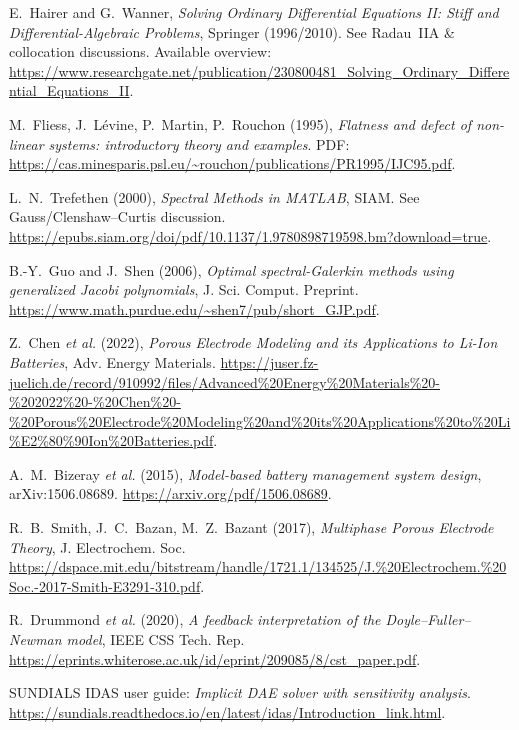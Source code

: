 \documentclass[11pt]{article}
\begin{document}
\begin{thebibliography}{99}\setlength{\itemsep}{0.25em}
E.~Hairer and G.~Wanner, \emph{Solving Ordinary Differential Equations II: Stiff and Differential-Algebraic Problems}, Springer (1996/2010). See Radau~IIA \& collocation discussions. Available overview: \url{https://www.researchgate.net/publication/230800481_Solving_Ordinary_Differential_Equations_II}.

M.~Fliess, J.~L\'evine, P.~Martin, P.~Rouchon (1995), \emph{Flatness and defect of non-linear systems: introductory theory and examples}. PDF: \url{https://cas.minesparis.psl.eu/~rouchon/publications/PR1995/IJC95.pdf}.

L.~N.~Trefethen (2000), \emph{Spectral Methods in MATLAB}, SIAM. See Gauss/Clenshaw--Curtis discussion. \url{https://epubs.siam.org/doi/pdf/10.1137/1.9780898719598.bm?download=true}.

B.-Y.~Guo and J.~Shen (2006), \emph{Optimal spectral-Galerkin methods using generalized Jacobi polynomials}, J. Sci. Comput. Preprint. \url{https://www.math.purdue.edu/~shen7/pub/short_GJP.pdf}.

Z.~Chen \emph{et al.} (2022), \emph{Porous Electrode Modeling and its Applications to Li-Ion Batteries}, Adv. Energy Materials. \url{https://juser.fz-juelich.de/record/910992/files/Advanced%20Energy%20Materials%20-%202022%20-%20Chen%20-%20Porous%20Electrode%20Modeling%20and%20its%20Applications%20to%20Li%E2%80%90Ion%20Batteries.pdf}.

A.~M.~Bizeray \emph{et al.} (2015), \emph{Model-based battery management system design}, arXiv:1506.08689. \url{https://arxiv.org/pdf/1506.08689}.

R.~B.~Smith, J.~C.~Bazan, M.~Z.~Bazant (2017), \emph{Multiphase Porous Electrode Theory}, J. Electrochem. Soc. \url{https://dspace.mit.edu/bitstream/handle/1721.1/134525/J.%20Electrochem.%20Soc.-2017-Smith-E3291-310.pdf}.

R.~Drummond \emph{et al.} (2020), \emph{A feedback interpretation of the Doyle--Fuller--Newman model}, IEEE CSS Tech. Rep. \url{https://eprints.whiterose.ac.uk/id/eprint/209085/8/cst_paper.pdf}.

SUNDIALS IDAS user guide: \emph{Implicit DAE solver with sensitivity analysis}. \url{https://sundials.readthedocs.io/en/latest/idas/Introduction_link.html}.


\end{thebibliography}
\end{document}
